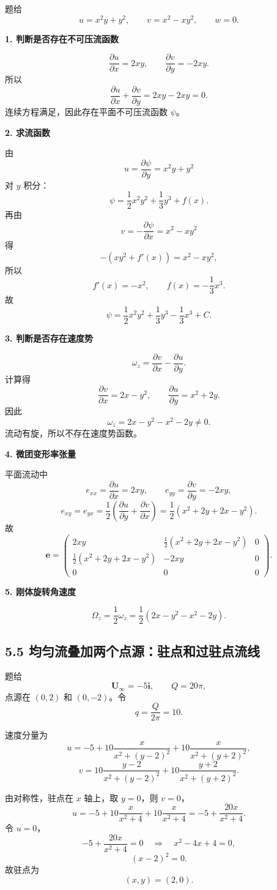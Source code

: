 \documentclass[UTF8,zihao=-4]{ctexart}
\begin{document}
题给
\[
u=x^2y+y^2,\qquad v=x^2-xy^2,\qquad w=0 .
\]

\textbf{1. 判断是否存在不可压流函数}

\[
\frac{\partial u}{\partial x}=2xy,\qquad
\frac{\partial v}{\partial y}=-2xy .
\]
所以
\[
\frac{\partial u}{\partial x}+\frac{\partial v}{\partial y}=2xy-2xy=0.
\]
连续方程满足，因此存在平面不可压流函数 \(\psi\)。

\textbf{2. 求流函数}

由
\[
u=\frac{\partial\psi}{\partial y}=x^2y+y^2
\]
对 \(y\) 积分：
\[
\psi=\frac12x^2y^2+\frac13y^3+f(x).
\]
再由
\[
v=-\frac{\partial\psi}{\partial x}=x^2-xy^2
\]
得
\[
-\left(xy^2+f'(x)\right)=x^2-xy^2,
\]
所以
\[
f'(x)=-x^2,\qquad f(x)=-\frac13x^3.
\]
故
\[
\boxed{\psi=\frac12x^2y^2+\frac13y^3-\frac13x^3+C.}
\]

\textbf{3. 判断是否存在速度势}

\[
\omega_z=\frac{\partial v}{\partial x}-\frac{\partial u}{\partial y}.
\]
计算得
\[
\frac{\partial v}{\partial x}=2x-y^2,\qquad
\frac{\partial u}{\partial y}=x^2+2y.
\]
因此
\[
\omega_z=2x-y^2-x^2-2y\ne 0.
\]
流动有旋，所以不存在速度势函数。

\textbf{4. 微团变形率张量}

平面流动中
\[
e_{xx}=\frac{\partial u}{\partial x}=2xy,\qquad
e_{yy}=\frac{\partial v}{\partial y}=-2xy,
\]
\[
e_{xy}=e_{yx}=\frac12\left(\frac{\partial u}{\partial y}
+\frac{\partial v}{\partial x}\right)
=\frac12(x^2+2y+2x-y^2).
\]
故
\[
\boxed{
\bm e=
\begin{pmatrix}
2xy & \frac12(x^2+2y+2x-y^2) & 0\\
\frac12(x^2+2y+2x-y^2) & -2xy & 0\\
0&0&0
\end{pmatrix}.}
\]

\textbf{5. 刚体旋转角速度}

\[
\boxed{
\Omega_z=\frac12\omega_z
=\frac12(2x-y^2-x^2-2y).}
\]

\subsection*{5.5 均匀流叠加两个点源：驻点和过驻点流线}

题给
\[
\bm U_\infty=-5\bm i,\qquad Q=20\pi,
\]
点源在 \((0,2)\) 和 \((0,-2)\)。令
\[
q=\frac{Q}{2\pi}=10 .
\]

速度分量为
\[
u=-5+10\frac{x}{x^2+(y-2)^2}
+10\frac{x}{x^2+(y+2)^2},
\]
\[
v=10\frac{y-2}{x^2+(y-2)^2}
+10\frac{y+2}{x^2+(y+2)^2}.
\]

由对称性，驻点在 \(x\) 轴上，取 \(y=0\)，则 \(v=0\)，
\[
u=-5+10\frac{x}{x^2+4}+10\frac{x}{x^2+4}
=-5+\frac{20x}{x^2+4}.
\]
令 \(u=0\)，
\[
-5+\frac{20x}{x^2+4}=0
\quad\Longrightarrow\quad
x^2-4x+4=0,
\]
\[
(x-2)^2=0.
\]
故驻点为
\[
\boxed{(x,y)=(2,0).}
\]
\end{document}
